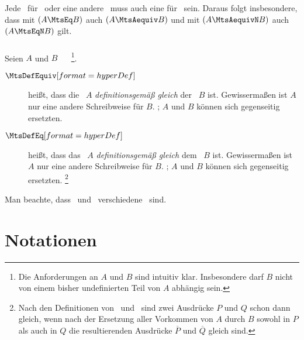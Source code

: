 Jede \interessierendeEigenschaft\ für \MtsAequiv\ oder eine andere \Aequivalenz\ muss auch eine für \MtsEq\ sein.
Daraus folgt insbesondere, dass mit $(A \MtsEq B)$ auch $(A \MtsAequiv B)$ und mit $(A \MtsAequivN B)$ auch $(A \MtsEqN B)$ gilt.

\subsubsection[Metadefinitionen]{\Metadefinitionen}%
\label {subsub:Metadefinitionen}

Seien $A$ und $B$ \Aussagen\ \textbzw\ \Objekte%
\footnote{%
	Die Anforderungen an $A$ und $B$ sind intuitiv klar.
	Insbesondere darf $B$ nicht von einem bisher undefinierten Teil von $A$ abhängig sein.
}.
\begin{description}
	\item[$\defSym{\MtsDefEquiv}$]  \label{def:Aussagedefinition}
	 heißt, dass die \Aussage\ $A$ \emph{definitionsgemäß gleich} der \Aussage\ $B$ ist.
	Gewissermaßen ist $A$ nur eine andere Schreibweise für $B$.
	; $A$ und $B$ können sich gegenseitig ersetzten.
	\item[$\defSym{\MtsDefEq}$]  \label{def:Objektdefinition}
	 heißt, dass das \Objekt\ $A$ \emph{definitionsgemäß gleich} dem \Objekt\ $B$ ist.
	Gewissermaßen ist $A$ nur eine andere Schreibweise für $B$.
	; $A$ und $B$ können sich gegenseitig ersetzten.%
	\footnote{%
		Nach den Definitionen von \MtsDefEquiv\ und \MtsDefEq\ sind zwei Ausdrücke $P$ und $Q$ schon dann gleich, wenn nach der Ersetzung aller Vorkommen von $A$ durch $B$ sowohl in $P$ als auch in $Q$ die resultierenden Ausdrücke $\overline{P}$ und $\overline{Q}$ gleich sind.
	}
\end{description}
Man beachte, dass \MtsDefEquiv\ und \MtsDefEq\ verschiedene \Sprachebenen\ sind.

\section     {Notationen}%
\label   {sec:Notationen}

